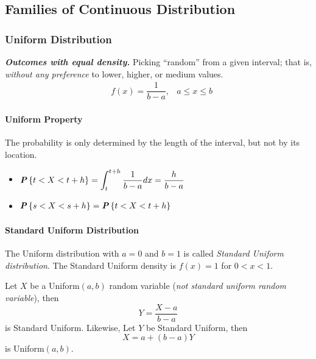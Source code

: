 \subsection{Families of Continuous Distribution}

\begin{multicols}{2}
\setlength{\columnsep}{1.5cm}
\setlength{\columnseprule}{0.2pt}

\subsubsection{Uniform Distribution}

\textbf{\textit{Outcomes with equal density.}} Picking ``random'' from a given interval; that is, \textit{without any preference} to lower, higher, or medium values.
\begin{align*}
  &f(x) = \dfrac{1}{b-a}, &a \leq x \leq b
\end{align*}

\paragraph{Uniform Property}
The probability is only determined by the length of the interval, but not by its location.
\begin{itemize}
  \item 
  $\begin{aligned}
    \textbf{\textit{P}}\left\{t < X < t + h\right\} = \int_t^{t+h} \frac{1}{b - a} dx = \frac{h}{b - a}
  \end{aligned}$
  \item
  $\begin{aligned}
    \textbf{\textit{P}}\left\{s < X < s + h\right\} = \textbf{\textit{P}}\left\{t < X < t + h\right\}
  \end{aligned}$
\end{itemize}

\paragraph{Standard Uniform Distribution}

The Uniform distribution with $a = 0$ and $b = 1$ is called \textit{Standard Uniform distribution}. The Standard Uniform density is $f(x) = 1$ for $0 < x < 1$.

Let $X$ be a Uniform$(a, b)$ random variable (\textit{not standard uniform random variable}), then
\begin{equation*}
    Y = \frac{X - a}{b - a}
\end{equation*}
is Standard Uniform. Likewise, Let $Y$ be Standard Uniform, then
\begin{equation*}
    X = a + (b-a)Y
\end{equation*}
is Uniform$(a, b)$.


\end{multicols}

